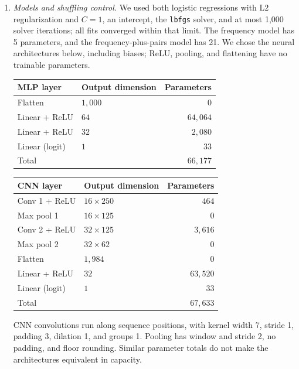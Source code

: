 \documentclass[12pt]{article}
\begin{document}
\begin{enumerate}
\begin{enumerate}[label=\textbf{\Alph*.}, leftmargin=*]
       \item \emph{Models and shuffling control.}
       We used both logistic regressions with L2 regularization and $C=1$,
       an intercept, the \texttt{lbfgs} solver, and at most 1,000 solver
       iterations; all fits converged within that limit. The frequency
       model has 5 parameters, and the frequency-plus-pairs model has 21.
       We chose the neural architectures below, including biases; ReLU, pooling,
       and flattening have no trainable parameters.
       \begin{center}
       {\small
       \begin{tabular}{l l r}
           \toprule
           MLP layer & Output dimension & Parameters \\
           \midrule
           Flatten & $1{,}000$ & 0 \\
           Linear + ReLU & $64$ & $64{,}064$ \\
           Linear + ReLU & $32$ & $2{,}080$ \\
           Linear (logit) & $1$ & $33$ \\
           \midrule
           Total & & $66{,}177$ \\
           \bottomrule
       \end{tabular}}
       \end{center}
       \begin{center}
       {\small
       \begin{tabular}{l l r}
           \toprule
           CNN layer & Output dimension & Parameters \\
           \midrule
           Conv 1 + ReLU & $16\times250$ & $464$ \\
           Max pool 1 & $16\times125$ & 0 \\
           Conv 2 + ReLU & $32\times125$ & $3{,}616$ \\
           Max pool 2 & $32\times62$ & 0 \\
           Flatten & $1{,}984$ & 0 \\
           Linear + ReLU & $32$ & $63{,}520$ \\
           Linear (logit) & $1$ & $33$ \\
           \midrule
           Total & & $67{,}633$ \\
           \bottomrule
       \end{tabular}}
       \end{center}
       CNN convolutions run along sequence positions, with kernel width 7,
       stride 1, padding 3, dilation 1, and groups 1. Pooling has window
       and stride 2, no padding, and floor rounding. Similar parameter
       totals do not make the architectures equivalent in capacity.


\end{enumerate}
\end{enumerate}
\end{document}
